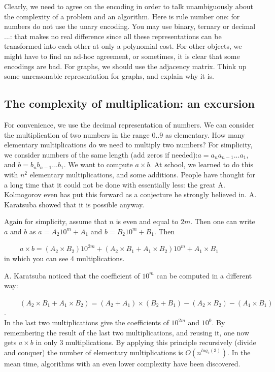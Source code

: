 Clearly, we need to agree on the encoding in order to talk
unambiguously about the complexity of a problem and an algorithm. Here
is rule number one: for numbers do not use the unary encoding. You may
use binary, ternary or decimal ...: that makes no real difference
since all these representations can be transformed into each other at
only a polynomial cost. For other objects, we might have to find an
ad-hoc agreement, or sometimes, it is clear that some encodings are
bad. For graphs, we should use the adjacency matrix. Think up some
unreasonable representation for graphs, and explain why it is.


\subsection{The complexity of multiplication: an excursion}

For convenience, we use the decimal representation of numbers.
We can consider the multiplication of two numbers in the range $0..9$
as elementary. How many elementary multiplications do we need to
multiply two numbers? For simplicity, we consider numbers of the same
length (add zeros if needed):$a= a_na_{n-1}...a_1$, and
$b = b_nb_{n-1}...b_1$. We want to compute $a \times b$. At school, we
learned to do this with $n^2$ elementary multiplications, and some
additions. People have thought for a long time that it could not be
done with essentially less: the great A. Kolmogorov even has put this
forward as a conjecture he strongly believed in. A. Karatsuba showed
that it is possible anyway.

Again for simplicity, assume that $n$ is even and equal to $2m$. Then
one can write $a$ and $b$ as
%
$a = A_{2}10^m + A_1$ and $b = B_{2}10^m + B_1$.
%
Then 

$~~~~~~~~~~a \times b = (A_{2}\times B_{2})10^{2m} + (A_{2}\times B_1 + A_1\times B_{2})10^m + A_1\times B_1 $ \\
in which you can see 4 multiplications.

A. Karatsuba noticed that the coefficient of $10^m$ can be computed in
a different way:

$~~~~~~~~~~(A_{2}\times B_1 + A_1\times B_{2}) = (A_{2} + A_1) \times (B_{2} +
B_1) - (A_{2}\times B_{2}) - (A_1\times B_1)$. \\
In the last two multiplications give the coefficients of $10^{2m}$ and
$10^0$. By remembering the result of the last two multiplications, and
reusing it, one now gets $a \times b$ in only 3 multiplications.
By applying this principle recursively (divide and conquer) the number
of elementary multiplications is $O(n^{log_2(3)})$. In the mean time,
algorithms with an even lower complexity have been discovered.

